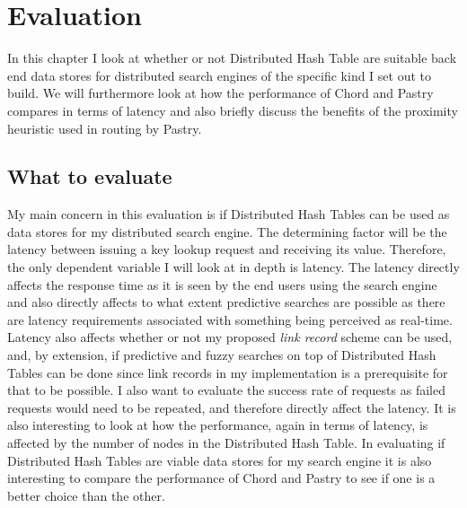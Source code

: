 

%
%
%
% 
%

\chapter{Evaluation}
In this chapter I look at whether or not Distributed Hash Table are suitable back end data stores for distributed search engines of the specific kind I set out to build. We will furthermore look at how the performance of Chord and Pastry compares in terms of latency and also briefly discuss the benefits of the proximity heuristic used in routing by Pastry. 

\section{What to evaluate}
My main concern in this evaluation is if Distributed Hash Tables can be used as data stores for my distributed search engine. The determining factor will be the latency between issuing a key lookup request and receiving its value. Therefore, the only dependent variable I will look at in depth is latency.
The latency directly affects the response time as it is seen by the end users using the search engine and also directly affects to what extent predictive searches are possible as there are latency requirements associated with something being perceived as real-time.
Latency also affects whether or not my proposed \emph{link record} scheme can be used, and, by extension, if predictive and fuzzy searches on top of Distributed Hash Tables can be done since link records in my implementation is a prerequisite for that to be possible.
I also want to evaluate the success rate of requests as failed requests would need to be repeated, and therefore directly affect the latency.
It is also interesting to look at how the performance, again in terms of latency, is affected by the number of nodes in the Distributed Hash Table.
In evaluating if Distributed Hash Tables are viable data stores for my search engine it is also interesting to compare the performance of Chord and Pastry to see if one is a better choice than the other.


